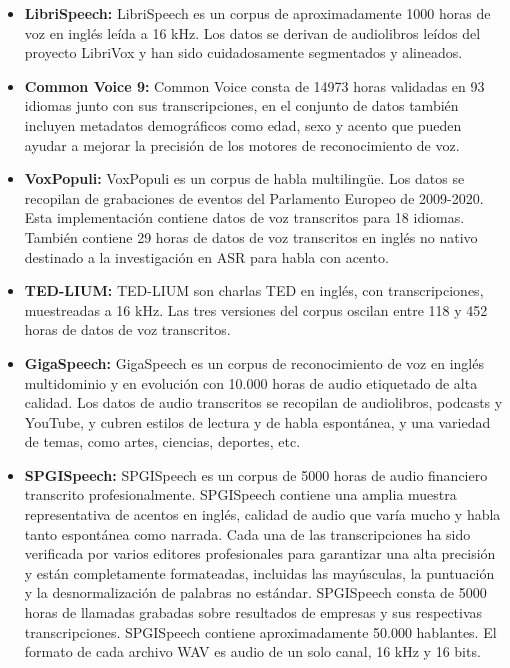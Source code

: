 \documentclass[conference]{IEEEtran}
\begin{document}
\begin{itemize}
    \item \textbf{LibriSpeech:} LibriSpeech \cite{7178964} es un corpus de aproximadamente 1000 horas de voz en inglés leída a 16 kHz. Los datos se derivan de audiolibros leídos del proyecto LibriVox y han sido cuidadosamente segmentados y alineados.
    \item \textbf{Common Voice 9:} Common Voice \cite{ardila2020common} consta de 14973 horas validadas en 93 idiomas junto con sus transcripciones, en el conjunto de datos también incluyen metadatos demográficos como edad, sexo y acento que pueden ayudar a mejorar la precisión de los motores de reconocimiento de voz.
    \item \textbf{VoxPopuli:} VoxPopuli \cite{wang2021voxpopuli} es un corpus de habla multilingüe. Los datos se recopilan de grabaciones de eventos del Parlamento Europeo de 2009-2020. Esta implementación contiene datos de voz transcritos para 18 idiomas. También contiene 29 horas de datos de voz transcritos en inglés no nativo destinado a la investigación en ASR para habla con acento.
    \item \textbf{TED-LIUM:} TED-LIUM \cite{rousseau-etal-2012-ted} son charlas TED en inglés, con transcripciones, muestreadas a 16 kHz. Las tres versiones del corpus oscilan entre 118 y 452 horas de datos de voz transcritos.
    \item \textbf{GigaSpeech:} GigaSpeech \cite{chen2021gigaspeech} es un corpus de reconocimiento de voz en inglés multidominio y en evolución con 10.000 horas de audio etiquetado de alta calidad. Los datos de audio transcritos se recopilan de audiolibros, podcasts y YouTube, y cubren estilos de lectura y de habla espontánea, y una variedad de temas, como artes, ciencias, deportes, etc.
    \item \textbf{SPGISpeech:} SPGISpeech \cite{oneill2021spgispeech} es un corpus de 5000 horas de audio financiero transcrito profesionalmente. SPGISpeech contiene una amplia muestra representativa de acentos en inglés, calidad de audio que varía mucho y habla tanto espontánea como narrada. Cada una de las transcripciones ha sido verificada por varios editores profesionales para garantizar una alta precisión y están completamente formateadas, incluidas las mayúsculas, la puntuación y la desnormalización de palabras no estándar. SPGISpeech consta de 5000 horas de llamadas grabadas sobre resultados de empresas y sus respectivas transcripciones. SPGISpeech contiene aproximadamente 50.000 hablantes. El formato de cada archivo WAV es audio de un solo canal, 16 kHz y 16 bits.

\end{itemize}
\end{document}
